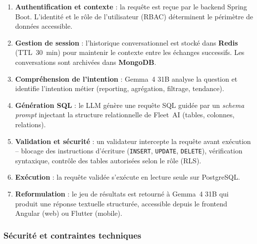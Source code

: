\begin{enumerate}
  \item \textbf{Authentification et contexte} : la requête est reçue par le backend Spring Boot. L'identité et le rôle de l'utilisateur (RBAC) déterminent le périmètre de données accessible.
  \item \textbf{Gestion de session} : l'historique conversationnel est stocké dans \textbf{Redis} (TTL~30~min) pour maintenir le contexte entre les échanges successifs. Les conversations sont archivées dans \textbf{MongoDB}.
  \item \textbf{Compréhension de l'intention} : Gemma~4 31B analyse la question et identifie l'intention métier (reporting, agrégation, filtrage, tendance).
  \item \textbf{Génération SQL} : le LLM génère une requête SQL guidée par un \textit{schema prompt} injectant la structure relationnelle de Fleet~AI (tables, colonnes, relations).
  \item \textbf{Validation et sécurité} : un validateur intercepte la requête avant exécution -- blocage des instructions d'écriture (\texttt{INSERT}, \texttt{UPDATE}, \texttt{DELETE}), vérification syntaxique, contrôle des tables autorisées selon le rôle (RLS).
  \item \textbf{Exécution} : la requête validée s'exécute en lecture seule sur PostgreSQL.
  \item \textbf{Reformulation} : le jeu de résultats est retourné à Gemma~4 31B qui produit une réponse textuelle structurée, accessible depuis le frontend Angular (web) ou Flutter (mobile).
\end{enumerate}

\subsubsection{Sécurité et contraintes techniques}

